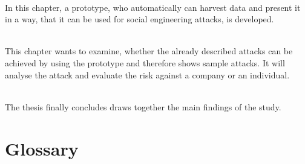 \vspace{0.5em}\\
\noindent In this chapter, a prototype, who automatically can harvest data and
present it in a way, that it can be used for social engineering attacks, is
developed.

\vspace{0.5em}\\
\noindent This chapter wants to examine, whether the already described attacks
can be achieved by using the prototype and therefore shows sample attacks. It
will analyse the attack and evaluate the risk against a company or an
individual.

\vspace{0.5em}\\
\noindent The thesis finally concludes draws together the main findings of the
study.

\newpage
\section{Glossary}
